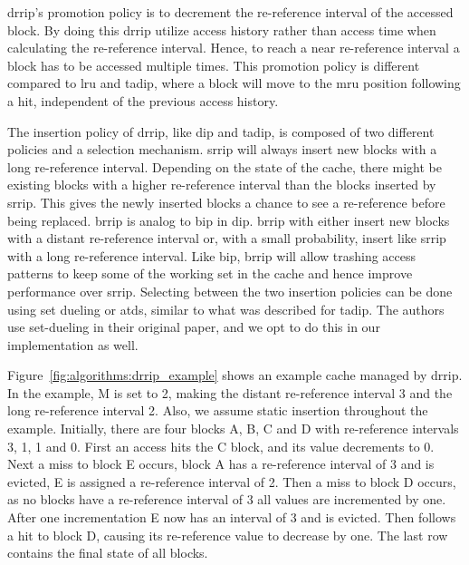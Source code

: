\gls{drrip}'s promotion policy is to decrement the re-reference interval of the accessed block.
By doing this \gls{drrip} utilize access history rather than access time when calculating the re-reference interval.
Hence, to reach a near re-reference interval a block has to be accessed multiple times.
This promotion policy is different compared to \gls{lru} and \gls{tadip}, where a block will move to the \gls{mru} position following a hit, independent of the previous access history.

The insertion policy of \gls{drrip}, like \gls{dip} and \gls{tadip}, is composed of two different policies and a selection mechanism.
\gls{srrip} will always insert new blocks with a long re-reference interval. 
Depending on the state of the cache, there might be existing blocks with a higher re-reference interval than the blocks inserted by \gls{srrip}.
This gives the newly inserted blocks a chance to see a re-reference before being replaced.
\gls{brrip} is analog to \gls{bip} in \gls{dip}.
\gls{brrip} with either insert new blocks with a distant re-reference interval or, with a small probability, insert like \gls{srrip} with a long re-reference interval.
Like \gls{bip}, \gls{brrip} will allow trashing access patterns to keep some of the working set in the cache and hence improve performance over \gls{srrip}.
Selecting between the two insertion policies can be done using set dueling or \glspl{atd}, similar to what was described for \gls{tadip}.
The authors use set-dueling in their original paper, and we opt to do this in our implementation as well.

Figure~\ref{fig:algorithms:drrip_example} shows an example cache managed by \gls{drrip}.
In the example, M is set to 2, making the distant re-reference interval 3 and the long re-reference interval 2. 
Also, we assume static insertion throughout the example.
Initially, there are four blocks A, B, C and D with re-reference intervals 3, 1, 1 and 0.
First an access hits the C block, and its value decrements to 0.
Next a miss to block E occurs, block A has a re-reference interval of 3 and is evicted, E is assigned a re-reference interval of 2.
Then a miss to block D occurs, as no blocks have a re-reference interval of 3 all values are incremented by one.
After one incrementation E now has an interval of 3 and is evicted.
Then follows a hit to block D, causing its re-reference value to decrease by one.
The last row contains the final state of all blocks.